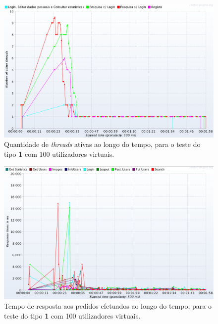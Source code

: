 \begin{figure}[H]
    \centering
    \includegraphics[width=1\textwidth]{images/Testes/4PC100T.png}
    \caption{Quantidade de \textit{threads} ativas ao longo do tempo, para o teste do tipo \textbf{1} com 100 utilizadores virtuais.}
    \label{fig:4PC_100_threads}
\end{figure}

\begin{figure}[H]
    \centering
    \includegraphics[width=1\textwidth]{images/Testes/4PC100R.png}
    \caption{Tempo de resposta aos pedidos efetuados ao longo do tempo, para o teste do tipo \textbf{1} com 100 utilizadores virtuais.}
    \label{fig:4PC_100_response}
\end{figure}

